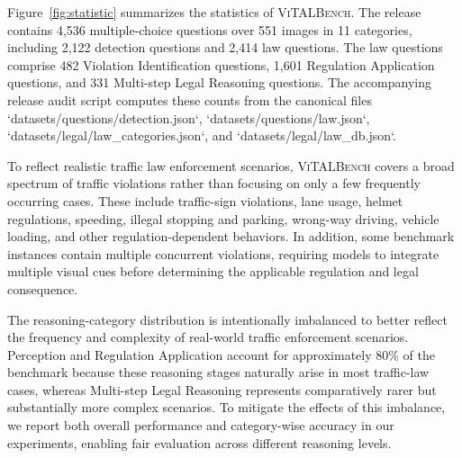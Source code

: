 Figure~\ref{fig:statistic} summarizes the statistics of \textsc{ViTALBench}. The release contains 4,536 multiple-choice questions over 551 images in 11 categories, including 2,122 detection questions and 2,414 law questions. The law questions comprise 482 Violation Identification questions, 1,601 Regulation Application questions, and 331 Multi-step Legal Reasoning questions. The accompanying release audit script computes these counts from the canonical files `datasets/questions/detection.json`, `datasets/questions/law.json`, `datasets/legal/law_categories.json`, and `datasets/legal/law_db.json`.

To reflect realistic traffic law enforcement scenarios, \textsc{ViTALBench} covers a broad spectrum of traffic violations rather than focusing on only a few frequently occurring cases. These include traffic-sign violations, lane usage, helmet regulations, speeding, illegal stopping and parking, wrong-way driving, vehicle loading, and other regulation-dependent behaviors. In addition, some benchmark instances contain multiple concurrent violations, requiring models to integrate multiple visual cues before determining the applicable regulation and legal consequence.

The reasoning-category distribution is intentionally imbalanced to better reflect the frequency and complexity of real-world traffic enforcement scenarios. Perception and Regulation Application account for approximately 80\% of the benchmark because these reasoning stages naturally arise in most traffic-law cases, whereas Multi-step Legal Reasoning represents comparatively rarer but substantially more complex scenarios. To mitigate the effects of this imbalance, we report both overall performance and category-wise accuracy in our experiments, enabling fair evaluation across different reasoning levels.